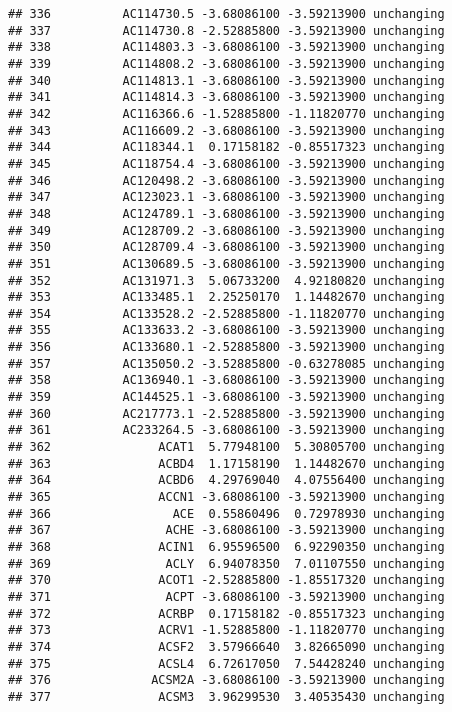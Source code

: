 \documentclass[]{article}
\begin{document}
\begin{verbatim}
## 336          AC114730.5 -3.68086100 -3.59213900 unchanging
## 337          AC114730.8 -2.52885800 -3.59213900 unchanging
## 338          AC114803.3 -3.68086100 -3.59213900 unchanging
## 339          AC114808.2 -3.68086100 -3.59213900 unchanging
## 340          AC114813.1 -3.68086100 -3.59213900 unchanging
## 341          AC114814.3 -3.68086100 -3.59213900 unchanging
## 342          AC116366.6 -1.52885800 -1.11820770 unchanging
## 343          AC116609.2 -3.68086100 -3.59213900 unchanging
## 344          AC118344.1  0.17158182 -0.85517323 unchanging
## 345          AC118754.4 -3.68086100 -3.59213900 unchanging
## 346          AC120498.2 -3.68086100 -3.59213900 unchanging
## 347          AC123023.1 -3.68086100 -3.59213900 unchanging
## 348          AC124789.1 -3.68086100 -3.59213900 unchanging
## 349          AC128709.2 -3.68086100 -3.59213900 unchanging
## 350          AC128709.4 -3.68086100 -3.59213900 unchanging
## 351          AC130689.5 -3.68086100 -3.59213900 unchanging
## 352          AC131971.3  5.06733200  4.92180820 unchanging
## 353          AC133485.1  2.25250170  1.14482670 unchanging
## 354          AC133528.2 -2.52885800 -1.11820770 unchanging
## 355          AC133633.2 -3.68086100 -3.59213900 unchanging
## 356          AC133680.1 -2.52885800 -3.59213900 unchanging
## 357          AC135050.2 -3.52885800 -0.63278085 unchanging
## 358          AC136940.1 -3.68086100 -3.59213900 unchanging
## 359          AC144525.1 -3.68086100 -3.59213900 unchanging
## 360          AC217773.1 -2.52885800 -3.59213900 unchanging
## 361          AC233264.5 -3.68086100 -3.59213900 unchanging
## 362               ACAT1  5.77948100  5.30805700 unchanging
## 363               ACBD4  1.17158190  1.14482670 unchanging
## 364               ACBD6  4.29769040  4.07556400 unchanging
## 365               ACCN1 -3.68086100 -3.59213900 unchanging
## 366                 ACE  0.55860496  0.72978930 unchanging
## 367                ACHE -3.68086100 -3.59213900 unchanging
## 368               ACIN1  6.95596500  6.92290350 unchanging
## 369                ACLY  6.94078350  7.01107550 unchanging
## 370               ACOT1 -2.52885800 -1.85517320 unchanging
## 371                ACPT -3.68086100 -3.59213900 unchanging
## 372               ACRBP  0.17158182 -0.85517323 unchanging
## 373               ACRV1 -1.52885800 -1.11820770 unchanging
## 374               ACSF2  3.57966640  3.82665090 unchanging
## 375               ACSL4  6.72617050  7.54428240 unchanging
## 376              ACSM2A -3.68086100 -3.59213900 unchanging
## 377               ACSM3  3.96299530  3.40535430 unchanging

\end{verbatim}
\end{document}
